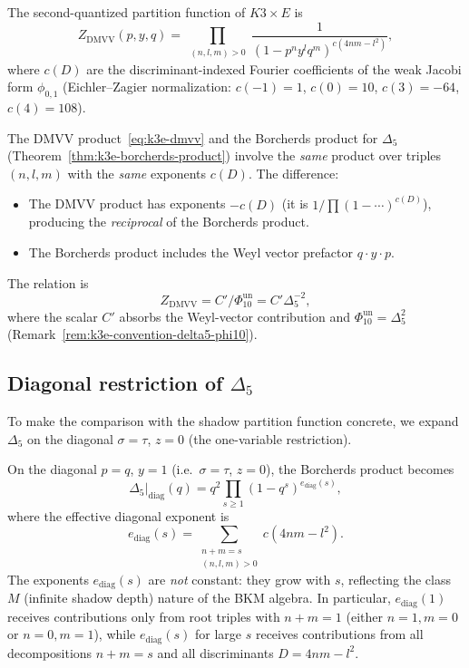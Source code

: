 \begin{theorem}
\label{thm:k3e-dmvv-product}
The second-quantized partition function of $K3 \times E$ is
\begin{equation}\label{eq:k3e-dmvv}
 Z_{\mathrm{DMVV}}(p, y, q)
 = \prod_{\substack{(n, l, m) > 0}} \frac{1}{(1 - p^n y^l q^m)^{c(4nm - l^2)}},
\end{equation}
where $c(D)$ are the discriminant-indexed Fourier coefficients of the weak Jacobi form $\phi_{0,1}$ (Eichler--Zagier normalization: $c(-1) = 1$, $c(0) = 10$, $c(3) = -64$, $c(4) = 108$).
\end{theorem}

\begin{remark}
\label{rem:k3e-dmvv-borcherds}
The DMVV product~\eqref{eq:k3e-dmvv} and the Borcherds product for $\Delta_5$ (Theorem~\ref{thm:k3e-borcherds-product}) involve the \emph{same} product over triples $(n,l,m)$ with the \emph{same} exponents $c(D)$. The difference:
\begin{itemize}
\item The DMVV product has exponents $-c(D)$ (it is $1/\prod(1-\cdots)^{c(D)}$), producing the \emph{reciprocal} of the Borcherds product.
\item The Borcherds product includes the Weyl vector prefactor $q \cdot y \cdot p$.
\end{itemize}
The relation is
\[
 Z_{\mathrm{DMVV}} = C'/\Phi_{10}^{\mathrm{un}} = C'\Delta_5^{-2},
\]
where the scalar \(C'\) absorbs the Weyl-vector contribution and
\(\Phi_{10}^{\mathrm{un}}=\Delta_5^2\)
(Remark~\ref{rem:k3e-convention-delta5-phi10}).
\end{remark}

\subsection{Diagonal restriction of \texorpdfstring{$\Delta_5$}{Delta-5}}
\label{subsec:k3e-diagonal-delta5}

To make the comparison with the shadow partition function concrete, we expand $\Delta_5$ on the diagonal $\sigma = \tau$, $z = 0$ (the one-variable restriction).

\begin{proposition}
\label{prop:k3e-diagonal-delta5}
On the diagonal $p = q$, $y = 1$ (i.e.\ $\sigma = \tau$, $z = 0$), the Borcherds product becomes
\[
 \Delta_5\big|_{\mathrm{diag}}(q) = q^2 \prod_{s \geq 1} (1 - q^s)^{e_{\mathrm{diag}}(s)},
\]
where the effective diagonal exponent is
\[
 e_{\mathrm{diag}}(s)
 = \sum_{\substack{n + m = s \\ (n,l,m) > 0}} c(4nm - l^2).
\]
The exponents $e_{\mathrm{diag}}(s)$ are \emph{not} constant: they grow with $s$, reflecting the class~$M$ (infinite shadow depth) nature of the BKM algebra. In particular, $e_{\mathrm{diag}}(1)$ receives contributions only from root triples with $n + m = 1$ (either $n=1, m=0$ or $n=0, m=1$), while $e_{\mathrm{diag}}(s)$ for large $s$ receives contributions from all decompositions $n + m = s$ and all discriminants $D = 4nm - l^2$.
\end{proposition}

